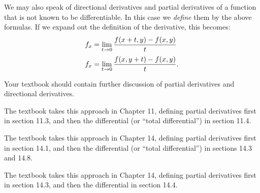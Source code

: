 We may also speak of directional derivatives and partial derivatives of a function that is not known to be differentiable.
In this case we \emph{define} them by the above formulas.
If we expand out the definition of the derivative, this becomes:
\begin{align}
  {f}_{x} &= \lim_{t\to 0} \frac{f(x+t,y) - f(x,y)}{t}\\[2pt]
  {f}_{x} &= \lim_{t\to 0} \frac{f(x,y+t) - f(x,y)}{t}.
\end{align}
\begin{notextbook}Your textbook should contain further discussion of partial derivatives and directional derivatives.\end{notextbook}%
\begin{stewart}The textbook takes this approach in Chapter 11, defining partial derivatives first in section 11.3, and then the differential (or ``total differential'') in section 11.4.\end{stewart}%
\begin{hugheshallett}The textbook takes this approach in Chapter 14, defining partial derivatives first in section 14.1, and then the differential (or ``total differential'') in sections 14.3 and 14.8.\end{hugheshallett}%
\begin{rogawski}The textbook takes this approach in Chapter 14, defining partial derivatives first in section 14.3, and then the differential in section 14.4.\end{rogawski}%

